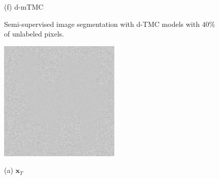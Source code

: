 \documentclass{article}
\def\x{{\mathbf x}}
\begin{document}
\begin{figure}[htb]
\begin{minipage}[b]{0.30\linewidth}
        \centerline{(f) d-mTMC}\medskip
      \end{minipage}
    \caption{Semi-supervised image segmentation with d-TMC models with $40\%$ of unlabeled pixels.}
    \label{fig:res_cow40}
\end{figure}

 \begin{figure}[htb]
    \begin{minipage}[b]{0.30\linewidth}
      \centering
      \centerline{\includegraphics[width=\textwidth, cfbox=black 1pt 0pt]{ress/camel60/camel60.png}}
      \centerline{(a) $\x_T$}\medskip
    \end{minipage}
    \hfill
    \begin{minipage}[b]{.30\linewidth}
      \centering

\end{minipage}
\end{figure}
\end{document}
